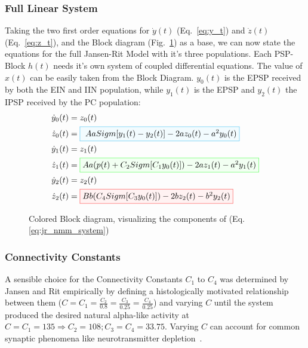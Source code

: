 
\subsubsection{Full Linear System}

Taking the two first order equations for $\dot{y}(t)$ (Eq.~\ref{eq:y_t}) and $\dot{z}(t)$ (Eq.~\ref{eq:z_t}),
and the Block diagram (Fig.~\ref{fig:JRBlockColored}) as a base,
we can now state the equations for the full Jansen-Rit Model with it's three populations.
Each PSP-Block $h(t)$ needs it's own system of coupled differential equations.
The value of $x(t)$ can be easily taken from the Block Diagram. $y_0(t)$ is the EPSP received by
both the EIN and IIN population, while $y_1(t)$ is the EPSP and $y_2(t)$ the IPSP received by the PC population:
\begin{equation}
    \begin{aligned}
        \dot{y}_0(t) &= z_0(t) \\
        \dot{z}_0(t) &= \fcolorbox{cyan!80}{cyan!5}{ $ Aa Sigm[y_1(t) - y_2(t)] - 2az_0(t) - a^{2}y_0(t) $}\\
        \dot{y}_1(t) &= z_1(t) \\
        \dot{z}_1(t) &= \fcolorbox{green!80}{green!5}{$ Aa(p(t) + C_{2}Sigm[C_{1}y_0(t)]) - 2az_1(t) - a^{2}y_1(t)$}\\
        \dot{y}_2(t) &= z_2(t) \\
        \dot{z}_2(t) &= \fcolorbox{red!80}{red!5}{$ Bb(C_{4}Sigm[C_{3}y_0(t)]) - 2bz_2(t) -b^{2}y_2(t)$} \\
    \end{aligned}\label{eq:jr_nmm_system}
\end{equation}

\begin{figure}[H]
    \centering
    
    \caption{Colored Block diagram, visualizing the components of (Eq. \ref{eq:jr_nmm_system})}
    \label{fig:JRBlockColored}
\end{figure}

\subsubsection{Connectivity Constants}

A sensible choice for the Connectivity Constants $C_1$ to $C_4$ was determined by Jansen and Rit empirically by
defining a histologically motivated relationship between them ($C = C_1 = \frac{C_2}{0.8} = \frac{C_3}{0.25} =
\frac{C_4}{0.25}$) and varying $C$ until the system produced the desired natural alpha-like activity at $C=C_1=135
\Rightarrow C_2=108; C_3=C_4=33.75$.
Varying $C$ can account for common synaptic phenomena like
neurotransmitter depletion~\parencite{jansen_electroencephalogram_1995}.

